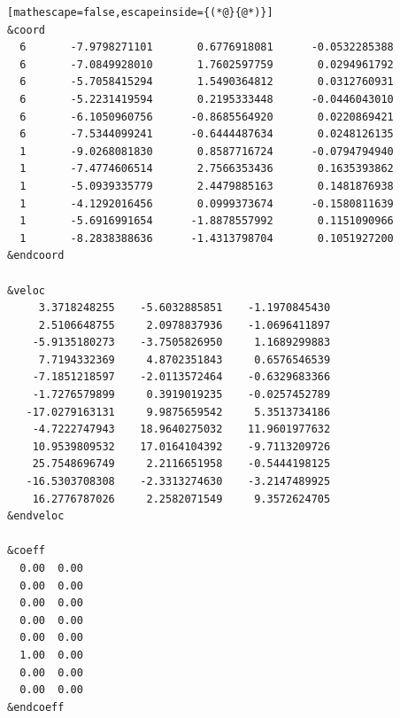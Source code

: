 \documentclass[letterpaper,12pt,titlepage]{article}
\begin{document}
\begin{appendix}
\begin{lstlisting}[mathescape=false,escapeinside={(*@}{@*)}]
&coord
  6       -7.9798271101       0.6776918081      -0.0532285388
  6       -7.0849928010       1.7602597759       0.0294961792
  6       -5.7058415294       1.5490364812       0.0312760931
  6       -5.2231419594       0.2195333448      -0.0446043010
  6       -6.1050960756      -0.8685564920       0.0220869421
  6       -7.5344099241      -0.6444487634       0.0248126135
  1       -9.0268081830       0.8587716724      -0.0794794940
  1       -7.4774606514       2.7566353436       0.1635393862
  1       -5.0939335779       2.4479885163       0.1481876938
  1       -4.1292016456       0.0999373674      -0.1580811639
  1       -5.6916991654      -1.8878557992       0.1151090966
  1       -8.2838388636      -1.4313798704       0.1051927200
&endcoord

&veloc
     3.3718248255    -5.6032885851    -1.1970845430
     2.5106648755     2.0978837936    -1.0696411897
    -5.9135180273    -3.7505826950     1.1689299883
     7.7194332369     4.8702351843     0.6576546539
    -7.1851218597    -2.0113572464    -0.6329683366
    -1.7276579899     0.3919019235    -0.0257452789
   -17.0279163131     9.9875659542     5.3513734186
    -4.7222747943    18.9640275032    11.9601977632
    10.9539809532    17.0164104392    -9.7113209726
    25.7548696749     2.2116651958    -0.5444198125
   -16.5303708308    -2.3313274630    -3.2147489925
    16.2776787026     2.2582071549     9.3572624705
&endveloc

&coeff
  0.00  0.00
  0.00  0.00
  0.00  0.00
  0.00  0.00
  0.00  0.00
  1.00  0.00
  0.00  0.00
  0.00  0.00
&endcoeff
\end{lstlisting}
\newpage

\end{appendix}
\end{document}
